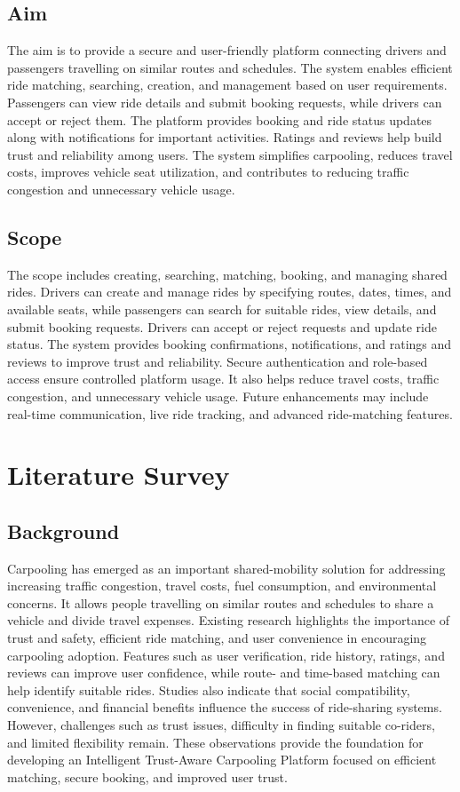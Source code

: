 \documentclass[12pt,a4paper,oneside]{report}
\begin{document}
\section{Aim}
The aim is to provide a secure and user-friendly platform connecting drivers and passengers travelling on similar routes and schedules. The system enables efficient ride matching, searching, creation, and management based on user requirements. Passengers can view ride details and submit booking requests, while drivers can accept or reject them. The platform provides booking and ride status updates along with notifications for important activities. Ratings and reviews help build trust and reliability among users. The system simplifies carpooling, reduces travel costs, improves vehicle seat utilization, and contributes to reducing traffic congestion and unnecessary vehicle usage.

\section{Scope}
The scope includes creating, searching, matching, booking, and managing shared rides. Drivers can create and manage rides by specifying routes, dates, times, and available seats, while passengers can search for suitable rides, view details, and submit booking requests. Drivers can accept or reject requests and update ride status. The system provides booking confirmations, notifications, and ratings and reviews to improve trust and reliability. Secure authentication and role-based access ensure controlled platform usage. It also helps reduce travel costs, traffic congestion, and unnecessary vehicle usage. Future enhancements may include real-time communication, live ride tracking, and advanced ride-matching features.

\chapter{Literature Survey}

\section{Background}
Carpooling has emerged as an important shared-mobility solution for addressing
increasing traffic congestion, travel costs, fuel consumption, and
environmental concerns. It allows people travelling on similar routes and
schedules to share a vehicle and divide travel expenses. Existing research
highlights the importance of trust and safety, efficient ride matching, and
user convenience in encouraging carpooling adoption. Features such as user
verification, ride history, ratings, and reviews can improve user confidence,
while route- and time-based matching can help identify suitable rides. Studies
also indicate that social compatibility, convenience, and financial benefits
influence the success of ride-sharing systems. However, challenges such as
trust issues, difficulty in finding suitable co-riders, and limited flexibility
remain. These observations provide the foundation for developing an
Intelligent Trust-Aware Carpooling Platform focused on efficient matching,
secure booking, and improved user trust.
\end{document}
